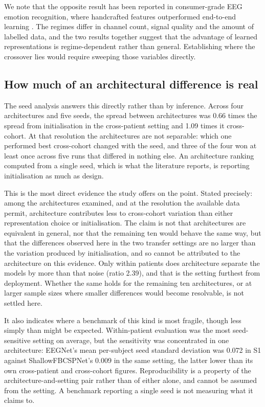 \documentclass[11pt,a4paper]{article}
\begin{document}
We note that the opposite result has been reported in consumer-grade EEG
emotion recognition, where handcrafted features outperformed end-to-end
learning \citep{consumereeg2026}. The regimes differ in channel count, signal
quality and the amount of labelled data, and the two results together suggest
that the advantage of learned representations is regime-dependent rather than
general. Establishing where the crossover lies would require sweeping those
variables directly.

\subsection{How much of an architectural difference is real}

The seed analysis answers this directly rather than by inference. Across
four architectures and five seeds, the spread between architectures was 0.66
times the spread from initialisation in the cross-patient setting and 1.09
times it cross-cohort. At that resolution the architectures are not
separable: which one performed best cross-cohort changed with the seed, and
three of the four won at least once across five runs that differed in
nothing else. An architecture ranking computed from a single seed, which is
what the literature reports, is reporting initialisation as much as design.

This is the most direct evidence the study offers on the point. Stated
precisely: among the architectures examined, and at the resolution the
available data permit, architecture contributes less to cross-cohort
variation than either representation choice or initialisation. The claim is
not that architectures are equivalent in general, nor that the remaining ten
would behave the same way, but that the differences observed here in the two
transfer settings are no larger than the variation produced by
initialisation, and so cannot be attributed to the architecture on this
evidence. Only within patients does architecture separate the models by more
than that noise (ratio 2.39), and that is the setting furthest from
deployment. Whether the same holds for the remaining ten architectures, or
at larger sample sizes where smaller differences would become resolvable, is
not settled here.

It also indicates where a benchmark of this kind is most fragile, though
less simply than might be expected. Within-patient evaluation was the most
seed-sensitive setting on average, but the sensitivity was concentrated in
one architecture: EEGNet's mean per-subject seed standard deviation was
0.072 in S1 against ShallowFBCSPNet's 0.009 in the same setting, the latter
lower than its own cross-patient and cross-cohort figures. Reproducibility
is a property of the architecture-and-setting pair rather than of either
alone, and cannot be assumed from the setting. A benchmark reporting a
single seed is not measuring what it claims to.
\end{document}
